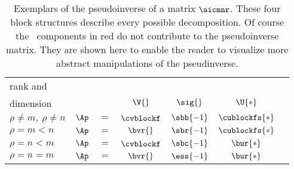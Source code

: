 \begin{table}[htdp]
\caption[Exemplars of the pseudoinverse]{Exemplars of the pseudoinverse of a matrix $\aicmnr$. These four block structures describe every possible decomposition. Of course the \ns \ components in red do not contribute to the pseudoinverse matrix. They are shown here to enable the reader to visualize more abstract manipulations of the pseudinverse.}
\begin{center}
\begin{tabular}{lcccccc}
%
 rank and \\
 dimension &&& $\V{}$ & $\sig{}$ & $\U{*}$ \\\hline
%
  $\rho \ne m,\ \rho \ne n$ \qquad \qquad & $\Ap$ & $=$ & $\cvblockf$ & $\sbb{-1}$ & $\cublockfs{*}$  \\[15pt]
%
  $\rho = m < n$   & $\Ap$ & $=$ & $\bvr{}$      & $\sbr{-1}$ & $\cublockfs{*}$  \\[15pt]
%
  $\rho = n < m$   & $\Ap$ & $=$ & $\cvblockf$   & $\sbc{-1}$ & $\bur{*}$  \\[15pt]
%
  $\rho = n  =  m$ & $\Ap$ & $=$ & $\bvr{}$      & $\ess{-1}$ & $\bur{*}$  \\
%
\end{tabular}
\end{center}
\label{tab:mpp exemplars}
\end{table}

\endinput